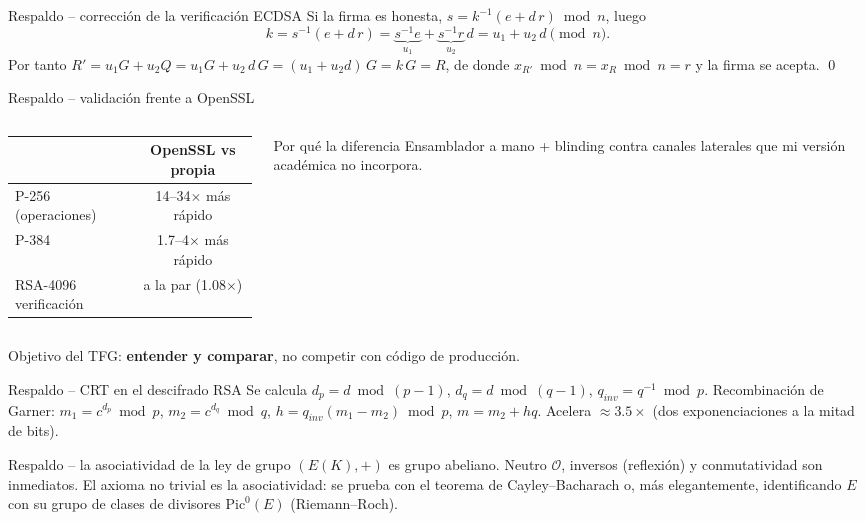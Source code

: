 \documentclass[aspectratio=169,11pt]{beamer}
\begin{document}
\begin{frame}{Respaldo -- corrección de la verificación ECDSA}
  \footnotesize
  Si la firma es honesta, $s = k^{-1}(e + d\,r)\bmod n$, luego
  \[ k = s^{-1}(e + d\,r) = \underbrace{s^{-1}e}_{u_1} + \underbrace{s^{-1}r}_{u_2}\,d
       = u_1 + u_2\,d \pmod n. \]
  Por tanto $R' = u_1 G + u_2 Q = u_1 G + u_2\,d\,G = (u_1 + u_2 d)\,G = k\,G = R$, de donde
  $x_{R'}\bmod n = x_R \bmod n = r$ y la firma se acepta. \qed
\end{frame}

\begin{frame}{Respaldo -- validación frente a OpenSSL}
  \begin{columns}[c]
    \begin{column}{0.52\textwidth}
      \footnotesize
      \begin{tabular}{lc}
        \toprule
        & OpenSSL vs propia \\
        \midrule
        P-256 (operaciones) & 14--34$\times$ más rápido \\
        P-384 & 1.7--4$\times$ más rápido \\
        RSA-4096 verificación & \alert{a la par} (1.08$\times$) \\
        \bottomrule
      \end{tabular}
    \end{column}
    \begin{column}{0.48\textwidth}
      \begin{block}{Por qué la diferencia}
        \footnotesize Ensamblador a mano + \alert{blinding} contra canales laterales que mi
        versión académica no incorpora.
      \end{block}
    \end{column}
  \end{columns}
  \vfill
  \footnotesize Objetivo del TFG: \textbf{entender y comparar}, no competir con código de producción.
\end{frame}

\begin{frame}{Respaldo -- CRT en el descifrado RSA}
  \footnotesize
  Se calcula $d_p=d\bmod(p-1)$, $d_q=d\bmod(q-1)$, $q_{inv}=q^{-1}\bmod p$. Recombinación de
  Garner: $m_1=c^{d_p}\bmod p$, $m_2=c^{d_q}\bmod q$, $h=q_{inv}(m_1-m_2)\bmod p$,
  $m=m_2+hq$. Acelera $\approx 3.5\times$ (dos exponenciaciones a la mitad de bits).
\end{frame}

\begin{frame}{Respaldo -- la asociatividad de la ley de grupo}
  \footnotesize
  $(E(K),+)$ es grupo abeliano. Neutro $\mathcal{O}$, inversos (reflexión) y conmutatividad
  son inmediatos. El axioma no trivial es la \alert{asociatividad}: se prueba con el teorema
  de Cayley--Bacharach o, más elegantemente, identificando $E$ con su grupo de clases de
  divisores $\mathrm{Pic}^0(E)$ (Riemann--Roch).
\end{frame}
\end{document}
